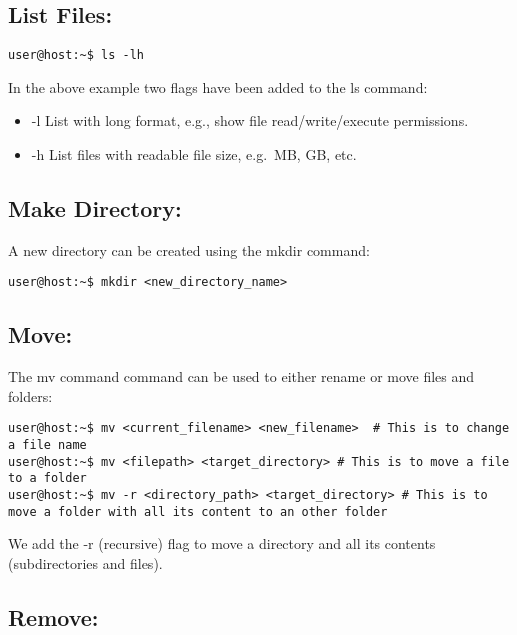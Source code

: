 \documentclass[
]{book}
\providecommand{\tightlist}{%
  \setlength{\itemsep}{0pt}\setlength{\parskip}{0pt}}
\begin{document}
\hypertarget{list-files}{%
\subsection{List Files:}\label{list-files}}

\begin{verbatim}
user@host:~$ ls -lh
\end{verbatim}

In the above example two flags have been added to the ls command:

\begin{itemize}
\tightlist
\item
  -l List with long format, e.g., show file read/write/execute permissions.
\item
  -h List files with readable file size, e.g.~MB, GB, etc.
\end{itemize}

\hypertarget{make-directory}{%
\subsection{Make Directory:}\label{make-directory}}

A new directory can be created using the mkdir command:

\begin{verbatim}
user@host:~$ mkdir <new_directory_name>
\end{verbatim}

\hypertarget{move}{%
\subsection{Move:}\label{move}}

The mv command command can be used to either rename or move files and folders:

\begin{verbatim}
user@host:~$ mv <current_filename> <new_filename>  # This is to change a file name
user@host:~$ mv <filepath> <target_directory> # This is to move a file to a folder
user@host:~$ mv -r <directory_path> <target_directory> # This is to move a folder with all its content to an other folder 
\end{verbatim}

We add the -r (recursive) flag to move a directory and all its contents (subdirectories and files).

\hypertarget{remove}{%
\subsection{Remove:}\label{remove}}
\end{document}
